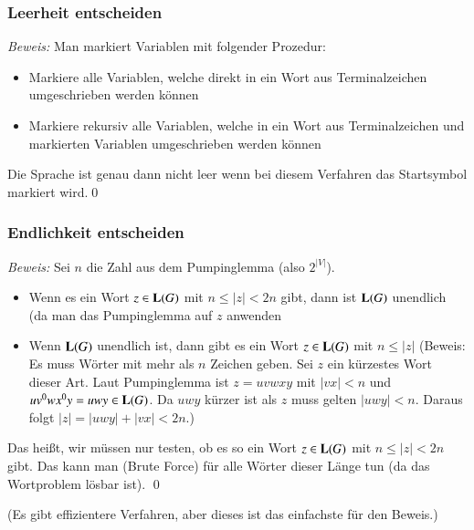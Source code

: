 \documentclass[onlymath]{beamer}
\begin{document}
\begin{frame}\frametitle{Leerheit entscheiden}


\emph{Beweis:} Man markiert Variablen mit folgender Prozedur:
\begin{itemize}
\item Markiere alle Variablen, welche direkt in ein Wort aus Terminalzeichen umgeschrieben werden können
\item Markiere rekursiv alle Variablen, welche in ein Wort aus Terminalzeichen und markierten Variablen umgeschrieben werden können
\end{itemize}
Die Sprache ist genau dann nicht leer wenn bei diesem Verfahren das Startsymbol markiert wird.\qed

\end{frame}

\begin{frame}\frametitle{Endlichkeit entscheiden}

\pause

\emph{Beweis:} Sei $n$ die Zahl aus dem Pumpinglemma (also $2^{|V|}$).\pause
\begin{itemize}
\item Wenn es ein Wort $z\in\textbf{\textcolor{black}{L}}(G)$ mit $n\leq|z|<2n$ gibt, dann ist $\textbf{\textcolor{black}{L}}(G)$
unendlich (da man das Pumpinglemma auf $z$ anwenden  \pause
\item Wenn $\textbf{\textcolor{black}{L}}(G)$ unendlich ist, dann gibt es ein Wort $z\in\textbf{\textcolor{black}{L}}(G)$ mit $n\leq|z|$ \pause
(Beweis: Es muss Wörter mit mehr als $n$ Zeichen geben. \pause Sei $z$ ein kürzestes Wort dieser Art. \pause
Laut Pumpinglemma ist $z=uvwxy$ mit $|vx|<n$ und $uv^0wx^0y=uwy\in\textbf{\textcolor{black}{L}}(G)$. \pause Da $uwy$ kürzer ist als $z$
muss gelten $|uwy|<n$. \pause Daraus folgt $|z|=|uwy|+|vx|<2n$.)\pause
\end{itemize}
Das heißt, wir müssen nur testen, ob es so ein Wort $z\in\textbf{\textcolor{black}{L}}(G)$ mit $n\leq|z|<2n$ gibt.
Das kann man (Brute Force) für alle Wörter dieser Länge tun (da das Wortproblem lösbar ist). \qed

{\tiny(Es gibt effizientere Verfahren, aber dieses ist das einfachste für den Beweis.)}

\end{frame}
\end{document}
